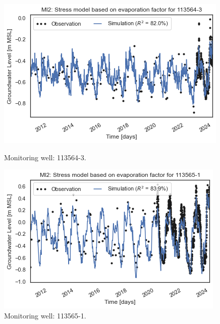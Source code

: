 \begin{figure}[htbp]
    \centering
    \begin{minipage}{0.32\textwidth}
        \centering
        \includegraphics[width=\linewidth]{frontmatter/Rozenburg-fig/1135643(2).png}
        \caption{Monitoring well: 113564-3.}
        \label{fig:113564-3}
    \end{minipage}
    \hfill
    \begin{minipage}{0.32\textwidth}
        \centering
        \includegraphics[width=\linewidth]{frontmatter/Rozenburg-fig/1135651.png}
        \caption{Monitoring well: 113565-1.}
        \label{fig:113565-1}
    \end{minipage}
    \hfill
    \begin{minipage}{0.32\textwidth}
        \centering

\end{minipage}
\end{figure}
